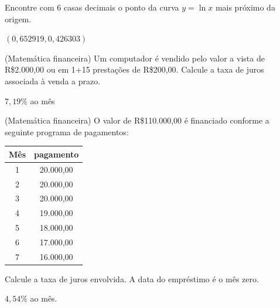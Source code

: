 \begin{exer} Encontre com 6 casas decimais o ponto da curva $y=\ln x$ mais próximo da origem.
\end{exer}
\begin{resp}

$(0,652919, 0,426303)$

\end{resp}


\begin{exer}(Matemática financeira) Um computador é vendido pelo valor a vista de R\$2.000,00 ou em 1+15 prestações de R\$200,00. Calcule a taxa de juros associada à venda a prazo.
\end{exer}

\begin{resp}

$7,19$\% ao mês

\end{resp}

\begin{exer}(Matemática financeira) O valor de R\$110.000,00 é financiado conforme a seguinte programa de pagamentos:

\begin{tabular}{|c|c|}
\hline
Mês & pagamento\\
\hline
1&20.000,00\\
2&20.000,00\\
3&20.000,00\\
4&19.000,00\\
5&18.000,00\\
6&17.000,00\\
7&16.000,00\\
\hline
\end{tabular}

Calcule a taxa de juros envolvida. A data do empréstimo é o mês zero.
 \end{exer}

\begin{resp}

$4,54$\% ao mês.

\end{resp}


